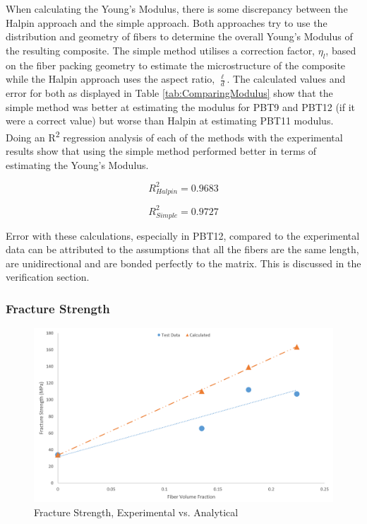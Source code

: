 \documentclass[11pt]{article}
\begin{document}
When calculating the Young's Modulus, there is some discrepancy between the Halpin approach and the simple approach. Both approaches try to use the distribution and geometry of fibers to determine the overall Young's Modulus of the resulting composite. The simple method utilises a correction factor, \(\eta_l\), based on the fiber packing geometry to estimate the microstructure of the composite while the Halpin approach uses the aspect ratio, \(\frac{\ell}{d}\). The calculated values and error for both as displayed in Table \ref{tab:ComparingModulus} show that the simple method was better at estimating the modulus for PBT9 and PBT12 (if it were a correct value) but worse than Halpin at estimating PBT11 modulus. Doing an R\textsuperscript{2} regression analysis of each of the methods with the experimental results show that using the simple method performed better in terms of estimating the Young's Modulus.

\begin{equation}
R^2_{Halpin} = 0.9683
\end{equation}

\begin{equation}
R^2_{Simple} = 0.9727
\end{equation}

Error with these calculations, especially in PBT12, compared to the experimental data can be attributed to the assumptions that all the fibers are the same length, are unidirectional and are bonded perfectly to the matrix. This is discussed in the verification section.

\subsubsection{Fracture Strength}

\begin{figure}[H]
\centering
\includegraphics[width=.95\linewidth]{figures/fracture_stress_test_vs_calc.png}
\caption{Fracture Strength, Experimental vs. Analytical}
\label{FScompare}
\end{figure}
\end{document}
